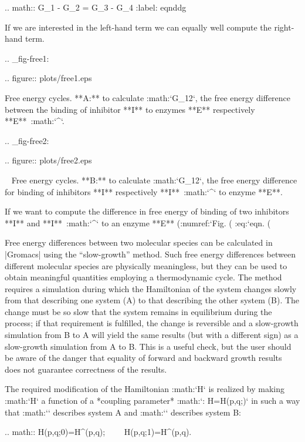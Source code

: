 {.. math:: \Delta G_1 - \Delta G_2 =       \Delta G_3 - \Delta G_4
          :label: eqnddg

If we are interested in the left-hand term we can equally well compute
the right-hand term.

.. _fig-free1:

.. figure:: plots/free1.eps

            Free energy cycles. **A:** to calculate :math:`\Delta G_{12}`, the free
            energy difference between the binding of inhibitor **I** to enzymes
            **E** respectively **E**\ :math:`^{\prime}`. 

.. _fig-free2:

.. figure:: plots/free2.eps

            Free energy cycles. **B:** to calculate
            :math:`\Delta G_{12}`, the free energy difference for binding of
            inhibitors **I** respectively **I**\ :math:`^{\prime}` to enzyme
            **E**.

If we want to compute the difference in free energy of binding of two
inhibitors **I** and **I**\ :math:`^{\prime}` to an enzyme **E**
(:numref:`Fig. (%
:eq:`eqn. (%

Free energy differences between two molecular species can be calculated
in |Gromacs| using the “slow-growth” method. Such free energy differences
between different molecular species are physically meaningless, but they
can be used to obtain meaningful quantities employing a thermodynamic
cycle. The method requires a simulation during which the Hamiltonian of
the system changes slowly from that describing one system (A) to that
describing the other system (B). The change must be so slow that the
system remains in equilibrium during the process; if that requirement is
fulfilled, the change is reversible and a slow-growth simulation from B
to A will yield the same results (but with a different sign) as a
slow-growth simulation from A to B. This is a useful check, but the user
should be aware of the danger that equality of forward and backward
growth results does not guarantee correctness of the results.

The required modification of the Hamiltonian :math:`H` is realized by
making :math:`H` a function of a *coupling parameter* :math:`\lambda:
H=H(p,q;\lambda)` in such a way that :math:`` describes system
A and :math:`` describes system B:

.. math:: H(p,q;0)=H{^{}}(p,q);~~~~ H(p,q;1)=H{^{}}(p,q).

}
